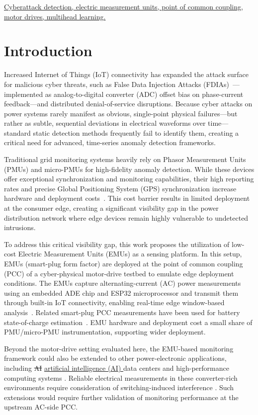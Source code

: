 \documentclass[conference,letterpaper]{IEEEtran}
\providecommand{\DIFadd}[1]{{\protect\color{blue}\uline{#1}}} %
\providecommand{\DIFdel}[1]{{\protect\color{red}\sout{#1}}}                      %
\providecommand{\DIFaddbegin}{} %
\providecommand{\DIFaddend}{} %
\providecommand{\DIFdelbegin}{} %
\providecommand{\DIFdelend}{} %
\begin{document}
\DIFaddbegin \begin{IEEEkeywords}
\DIFadd{Cyberattack detection, electric measurement units, point of common coupling, motor drives, multihead learning.
}\end{IEEEkeywords}

\DIFaddend \section{Introduction}
Increased Internet of Things (IoT) connectivity has expanded the attack surface for malicious cyber threats, such as False Data Injection Attacks (FDIAs)~\cite{liu2009}---implemented as analog-to-digital converter (ADC) offset bias on phase-current feedback---and distributed denial-of-service disruptions. Because cyber attacks on power systems rarely manifest as obvious, single-point physical failures---but rather as subtle, sequential deviations in electrical waveforms over time---standard static detection methods frequently fail to identify them, creating a critical need for advanced, time-series anomaly detection frameworks.

Traditional grid monitoring systems heavily rely on Phasor Measurement Units (PMUs) and micro-PMUs for high-fidelity anomaly detection. While these devices offer exceptional synchronization and monitoring capabilities, their high reporting rates and precise Global Positioning System (GPS) synchronization increase hardware and deployment costs~\cite{vonmeier2017}. This cost barrier results in limited deployment at the consumer edge, creating a significant visibility gap in the power distribution network where edge devices remain highly vulnerable to undetected intrusions.

To address this critical visibility gap, this work proposes the utilization of low-cost Electric Measurement Units (EMUs) as a sensing platform. In this setup, EMUs (smart-plug form factor) are deployed at the point of common coupling (PCC) of a cyber-physical motor-drive testbed to emulate edge deployment conditions. The EMUs capture alternating-current (AC) power measurements using an embedded ADE chip and ESP32 microprocessor and transmit them through built-in IoT connectivity, enabling real-time edge window-based analysis~\cite{najarEMU2026}. Related smart-plug PCC measurements have been used for battery state-of-charge estimation~\cite{najarSOC2026}. EMU hardware and deployment cost a small share of PMU/micro-PMU instrumentation, supporting wider deployment.

Beyond the motor-drive setting evaluated here, the EMU-based monitoring framework could also be extended to other power-electronic applications, including \DIFdelbegin \DIFdel{AI }\DIFdelend \DIFaddbegin \DIFadd{artificial intelligence (AI) }\DIFaddend data centers and high-performance computing systems \cite{Habibi2026DataCenters,Lotfi2026FCML}.
Reliable electrical measurements in these converter-rich environments require consideration of switching-induced interference \cite{Omidi2026HybridSensor}.
Such extensions would require further validation of monitoring performance at the upstream AC-side PCC.
\end{document}
